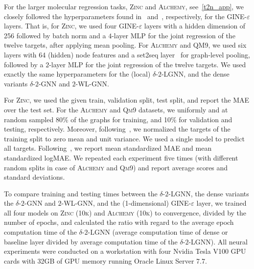 \documentclass{article}
\theoremstyle{definition}
\newcommand{\gineeps}{\textsf{GINE-$\varepsilon$}\xspace}
\begin{document}
\begin{description}
	For the larger molecular regression tasks, \textsc{Zinc} and \textsc{Alchemy}, see~\cref{t2n_app}, we closely followed the hyperparameters found in~\cite{Dwi+2020} and~\cite{Che+2020}, respectively, for the \gineeps layers. That is, for \textsc{Zinc}, we used four \gineeps layers with a hidden dimension of 256 followed by batch norm and a $4$-layer MLP for the joint regression of the twelve targets, after applying mean pooling. For \textsc{Alchemy} and \textsc{QM9}, we used six layers with 64 (hidden) node features and a set2seq layer~\cite{Vin+2016} for graph-level pooling, followed by a $2$-layer MLP for the joint regression of the twelve targets. We used exactly the same hyperparameters for the (local) $\delta$-$2$-\textsf{LGNN}, and the dense variants $\delta$-$2$-\textsf{GNN} and $2$-\textsf{WL-GNN}. 
	
	For \textsc{Zinc}, we used the given train, validation split, test split, and report the MAE over the test set. For the \textsc{Alchemy} and \textsc{Qm9} datasets, we uniformly and at random sampled 80\% of the graphs for training, and 10\% for validation and testing, respectively. Moreover, following~\cite{Che+2020,Gil+2017}, we normalized the targets of the training split to zero mean and unit variance. We used a single model to predict all targets. Following~\cite[Appendix C]{Kli+2020}, we report mean standardized MAE and mean standardized logMAE. We repeated each experiment five times (with different random splits in case of \textsc{Alchemy} and \textsc{Qm9}) and report average scores and standard deviations. 
	
	To compare training and testing times between the $\delta$-$2$-\textsf{LGNN}, the dense variants the $\delta$-$2$-\textsf{GNN} and $2$-\textsf{WL-GNN}, and the (1-dimensional) \gineeps layer, we trained all four models on \textsc{Zinc (10k)} and \textsc{Alchemy (10k)} to convergence, divided by the number of epochs, and calculated the ratio with regard to the average epoch computation time of the $\delta$-$2$-\textsf{LGNN} (average computation time of dense or baseline layer divided by average computation time of the $\delta$-$2$-\textsf{LGNN}). All neural experiments were conducted on a workstation with four Nvidia Tesla V100 GPU cards with 32GB of GPU memory running Oracle Linux Server 7.7.
\end{description} 







 
\end{document}
